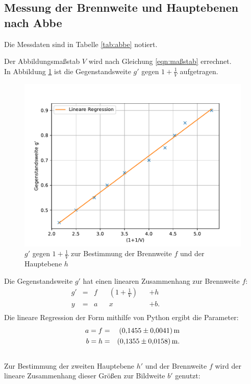 \subsection{Messung der Brennweite und Hauptebenen nach Abbe}
Die Messdaten sind in Tabelle \ref{tab:abbe} notiert.

Der Abbildungsmaßstab $V$ wird nach Gleichung \eqref{eqn:maßstab} errechnet.
\\In Abbildung \ref{fig:abbe1} ist die Gegenstandsweite $g'$ gegen $1+\frac{1}{V}$ aufgetragen.
\begin{figure}[h!]
  \centering
  \includegraphics[width=\textwidth]{abbe1.pdf}
  \caption{$g'$ gegen $1+\frac{1}{V}$ zur Bestimmung der Brennweite $f$ und der Hauptebene $h$}
  \label{fig:abbe1}
\end{figure}
Die Gegenstandsweite $g'$ hat einen linearen Zusammenhang zur Brennweite $f$:
\begin{align*}
  g' &=& f && \left(1+\frac{1}{V} \right) && + h && && &&\\
  y  &=& a && x                           && + b.&& && &&\\
\end{align*}
Die lineare Regression der Form mithilfe von Python ergibt die Parameter:
\begin{align*}
  a = f &=& \SI{0.1455 \pm 0.0041}{m}\\
  b = h &=& \SI{0.1355 \pm 0.0158}{m}.\\
\end{align*}
\\Zur Bestimmung der zweiten Hauptebene $h'$ und der Brennweite $f$ wird der lineare Zusammenhang dieser Größen zur Bildweite $b'$ genutzt:

